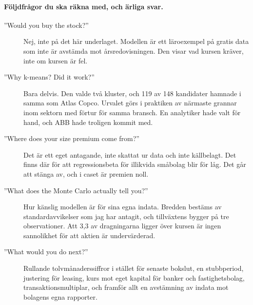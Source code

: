 \paragraph{Följdfrågor du ska räkna med, och ärliga svar.}

\begin{description}
  \item[”Would you buy the stock?”] Nej, inte på det här underlaget. Modellen är ett läroexempel
    på gratis data som inte är avstämda mot årsredovisningen. Den visar vad kursen kräver,
    inte om kursen är fel.
  \item[”Why k-means? Did it work?”] Bara delvis. Den valde två kluster, och 119 av 148
    kandidater hamnade i samma som Atlas Copco. Urvalet görs i praktiken av närmaste grannar
    inom sektorn med förtur för samma bransch. En analytiker hade valt för hand, och ABB hade
    troligen kommit med.
  \item[”Where does your size premium come from?”] Det är ett eget antagande, inte skattat ur
    data och inte källbelagt. Det finns där för att regressionsbeta för illikvida småbolag blir
    för låg. Det går att stänga av, och i caset är premien noll.
  \item[”What does the Monte Carlo actually tell you?”] Hur känslig modellen är för sina egna
    indata. Bredden bestäms av standardavvikelser som jag har antagit, och tillväxtens bygger
    på tre observationer. Att 3,3\pct{} av dragningarna ligger över kursen är ingen sannolikhet
    för att aktien är undervärderad.
  \item[”What would you do next?”] Rullande tolvmånaderssiffror i stället för senaste bokslut,
    en stubbperiod, justering för leasing, kurs mot eget kapital för banker och fastighetsbolag,
    transaktionsmultiplar, och framför allt en avstämning av indata mot bolagens egna rapporter.
\end{description}
